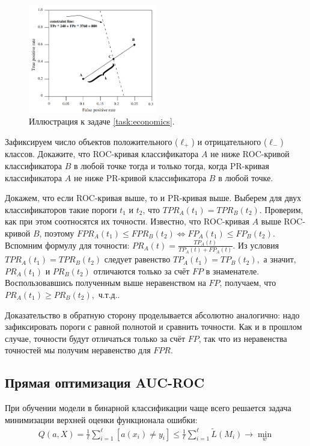 \documentclass[12pt,a4paper]{article}
\begin{document}
\begin{esSolution}
\begin{figure}[th!]
	\centering
	\includegraphics[width=0.5\textwidth]{./img/ml_roc_cross.png}
	\caption{Иллюстрация к задаче \ref{task:economics}.}
 \label{fig:const}
\end{figure}

\end{esSolution}

\begin{vkProblem}
Зафиксируем число объектов положительного ($\ell_{+}$) и отрицательного ($\ell_{-}$) классов.
Докажите, что ROC-кривая классификатора $A$ не ниже ROC-кривой классификатора $B$ в любой точке тогда и только тогда, когда PR-кривая классификатора $A$ не ниже PR-кривой классификатора $B$ в любой точке.
\end{vkProblem}

\begin{esSolution}
Докажем, что если ROC-кривая выше, то и PR-кривая выше.
Выберем для двух классификаторов такие пороги $t_1$ и $t_2$, что $TPR_A(t_1) = TPR_B(t_2).$
Проверим, как при этом соотносятся их точности.
Известно, что ROC-кривая $A$ выше ROC-кривой $B$, поэтому $FPR_A(t_1) \leqslant FPR_B(t_2) \Leftrightarrow FP_A(t_1) \leqslant FP_B(t_2).$
Вспомним формулу для точности: $PR_A(t) = \frac{TP_A(t)}{TP_A(t) + FP_A(t)}.$
Из условия $TPR_A(t_1) = TPR_B(t_2)$ следует равенство $TP_A(t_1) = TP_B(t_2),$ а значит, $PR_A(t_1)$ и $PR_B(t_2)$ отличаются только за счёт $FP$ в знаменателе.
Воспользовавшись полученным выше неравенством на $FP$, получаем, что $PR_A(t_1) \geqslant PR_B(t_2),$ ч.т.д.. 

Доказательство в обратную сторону проделывается абсолютно аналогично: надо зафиксировать пороги с равной полнотой и сравнить точности.
Как и в прошлом случае, точности будут отличаться только за счёт $FP$, так что из неравенства точностей мы получим неравенство для $FPR$.
\end{esSolution}

	\subsection{Прямая оптимизация AUC-ROC}
	\par При обучении модели в бинарной классификации чаще всего решается задача минимизации верхней оценки функционала ошибки:
	\begin{align*}
	Q(a, X) = \frac{1}{\ell}\sum_{i=1}^\ell [a(x_i) \ne y_i] \le \frac{1}{\ell} \sum_{i=1}^\ell \tilde{L}(M_i) \to \min_w
	\end{align*}
	
\end{document}
